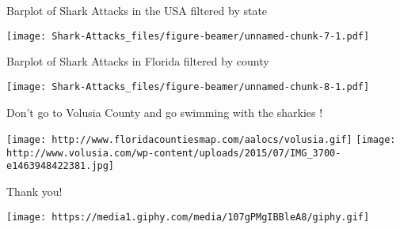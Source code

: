 \documentclass[ignorenonframetext,]{beamer}
\begin{document}
\begin{frame}{Barplot of Shark Attacks in the USA filtered by state}
\protect\hypertarget{barplot-of-shark-attacks-in-the-usa-filtered-by-state}{}

\texttt{[image: Shark-Attacks\_files/figure-beamer/unnamed-chunk-7-1.pdf]}

\end{frame}

\begin{frame}{Barplot of Shark Attacks in Florida filtered by county}
\protect\hypertarget{barplot-of-shark-attacks-in-florida-filtered-by-county}{}

\texttt{[image: Shark-Attacks\_files/figure-beamer/unnamed-chunk-8-1.pdf]}

\end{frame}

\begin{frame}{Don't go to Volusia County and go swimming with the
sharkies !}
\protect\hypertarget{dont-go-to-volusia-county-and-go-swimming-with-the-sharkies}{}

\texttt{[image: http://www.floridacountiesmap.com/aalocs/volusia.gif]}
\texttt{[image: http://www.volusia.com/wp-content/uploads/2015/07/IMG\_3700-e1463948422381.jpg]}

\end{frame}

\begin{frame}{Thank you!}
\protect\hypertarget{thank-you}{}

\texttt{[image: https://media1.giphy.com/media/107gPMgIBBleA8/giphy.gif]}

\end{frame}
\end{document}
